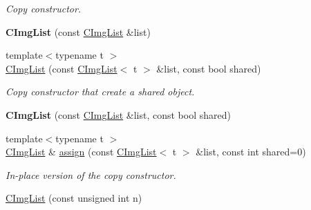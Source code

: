 \begin{DoxyCompactItemize}
\begin{DoxyCompactList}\small\item\em Copy constructor. \end{DoxyCompactList}\item 
\hypertarget{structcimg__library_1_1_c_img_list_a62ae120be1650e651c98eea3335d9978}{{\bfseries C\-Img\-List} (const \hyperlink{structcimg__library_1_1_c_img_list}{C\-Img\-List} \&list)}\label{structcimg__library_1_1_c_img_list_a62ae120be1650e651c98eea3335d9978}

\item 
\hypertarget{structcimg__library_1_1_c_img_list_a25745ae2bd8fda1b9b2e6fa6a9b14de7}{{\footnotesize template$<$typename t $>$ }\\\hyperlink{structcimg__library_1_1_c_img_list_a25745ae2bd8fda1b9b2e6fa6a9b14de7}{C\-Img\-List} (const \hyperlink{structcimg__library_1_1_c_img_list}{C\-Img\-List}$<$ t $>$ \&list, const bool shared)}\label{structcimg__library_1_1_c_img_list_a25745ae2bd8fda1b9b2e6fa6a9b14de7}

\begin{DoxyCompactList}\small\item\em Copy constructor that create a shared object. \end{DoxyCompactList}\item 
\hypertarget{structcimg__library_1_1_c_img_list_aef853abbdca79f4c5c516f157aab354a}{{\bfseries C\-Img\-List} (const \hyperlink{structcimg__library_1_1_c_img_list}{C\-Img\-List} \&list, const bool shared)}\label{structcimg__library_1_1_c_img_list_aef853abbdca79f4c5c516f157aab354a}

\item 
\hypertarget{structcimg__library_1_1_c_img_list_a38bea14a3e64c2235bba89ebf7dd86e4}{{\footnotesize template$<$typename t $>$ }\\\hyperlink{structcimg__library_1_1_c_img_list}{C\-Img\-List} \& \hyperlink{structcimg__library_1_1_c_img_list_a38bea14a3e64c2235bba89ebf7dd86e4}{assign} (const \hyperlink{structcimg__library_1_1_c_img_list}{C\-Img\-List}$<$ t $>$ \&list, const int shared=0)}\label{structcimg__library_1_1_c_img_list_a38bea14a3e64c2235bba89ebf7dd86e4}

\begin{DoxyCompactList}\small\item\em In-\/place version of the copy constructor. \end{DoxyCompactList}\item 
\hypertarget{structcimg__library_1_1_c_img_list_a0f9c6c3ea20c2bb5c1efa312a718072e}{\hyperlink{structcimg__library_1_1_c_img_list_a0f9c6c3ea20c2bb5c1efa312a718072e}{C\-Img\-List} (const unsigned int n)}\label{structcimg__library_1_1_c_img_list_a0f9c6c3ea20c2bb5c1efa312a718072e}


\end{DoxyCompactItemize}
